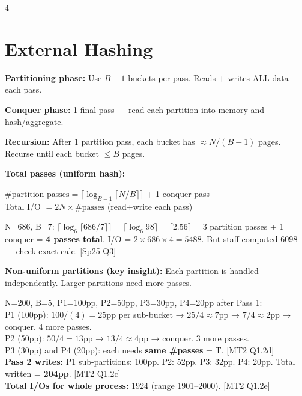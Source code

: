 \documentclass[8pt,letterpaper]{article}
\newcommand{\key}[1]{\textbf{\color{red!70!black}#1}}
\newcommand{\qref}[1]{{\fontsize{3.5}{4}\selectfont\color{purple!60!black}[#1]}}
\begin{document}
\begin{multicols*}{4}
\section{External Hashing}
\key{Partitioning phase:} Use $B-1$ buckets per pass. Reads + writes ALL data each pass.

\key{Conquer phase:} 1 final pass — read each partition into memory and hash/aggregate.

\key{Recursion:} After 1 partition pass, each bucket has $\approx N/(B-1)$ pages. Recurse until each bucket $\le B$ pages.

\key{Total passes (uniform hash):}
\begin{ansbox}
$\#\text{partition passes} = \lceil\log_{B-1}\lceil N/B\rceil\rceil$ \quad + 1 conquer pass\\
Total I/O $= 2N \times \#\text{passes}$ (read+write each pass)
\end{ansbox}

\begin{ansbox}
N=686, B=7: $\lceil\log_6\lceil686/7\rceil\rceil = \lceil\log_6 98\rceil = \lceil2.56\rceil = 3$ partition passes + 1 conquer = \textbf{4 passes total}. I/O = $2\times686\times4=5488$. But staff computed 6098 — check exact calc. \qref{Sp25 Q3}
\end{ansbox}

\key{Non-uniform partitions (key insight):} Each partition is handled independently. Larger partitions need more passes.

\begin{ansbox}
N=200, B=5, P1=100pp, P2=50pp, P3=30pp, P4=20pp after Pass 1:\\
P1 (100pp): $100/(4)=25$pp per sub-bucket → $25/4\approx7$pp → $7/4\approx2$pp → conquer. 4 more passes.\\
P2 (50pp): $50/4=13$pp → $13/4\approx4$pp → conquer. 3 more passes.\\
P3 (30pp) and P4 (20pp): each needs \textbf{same \#passes} = T. \qref{MT2 Q1.2d}\\
\textbf{Pass 2 writes:} P1 sub-partitions: 100pp. P2: 52pp. P3: 32pp. P4: 20pp. Total written = \textbf{204pp}. \qref{MT2 Q1.2c}\\
\textbf{Total I/Os for whole process:} 1924 (range 1901–2000). \qref{MT2 Q1.2e}
\end{ansbox}


\end{multicols*}
\end{document}
